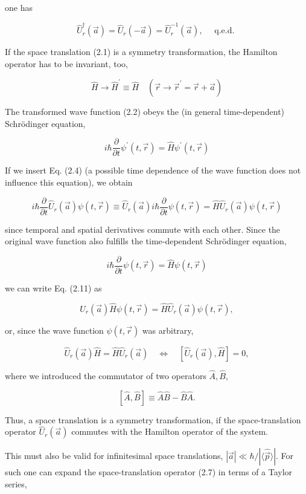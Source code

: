 \documentclass[10pt, letterpaper]{article}
\begin{document}
one has

$$
\hat{U}_{r}^{\dagger}(\vec{a})=\hat{U}_{r}(-\vec{a})=\hat{U}_{r}^{-1}(\vec{a}), \quad \text { q.e.d. }
$$

If the space translation (2.1) is a symmetry transformation, the Hamilton operator has to be invariant, too,

$$
\hat{H} \longrightarrow \hat{H}^{\prime} \equiv \hat{H} \quad\left(\vec{r} \longrightarrow \vec{r}^{\prime}=\vec{r}+\vec{a}\right)
$$

The transformed wave function (2.2) obeys the (in general time-dependent) Schrödinger equation,

$$
i \hbar \frac{\partial}{\partial t} \psi^{\prime}(t, \vec{r})=\hat{H} \psi^{\prime}(t, \vec{r})
$$

If we insert Eq. (2.4) (a possible time dependence of the wave function does not influence this equation), we obtain

$$
i \hbar \frac{\partial}{\partial t} \hat{U}_{r}(\vec{a}) \psi(t, \vec{r}) \equiv \hat{U}_{r}(\vec{a}) i \hbar \frac{\partial}{\partial t} \psi(t, \vec{r})=\hat{H} \hat{U}_{r}(\vec{a}) \psi(t, \vec{r})
$$

since temporal and spatial derivatives commute with each other. Since the original wave function also fulfills the time-dependent Schrödinger equation,

$$
i \hbar \frac{\partial}{\partial t} \psi(t, \vec{r})=\hat{H} \psi(t, \vec{r})
$$

we can write Eq. (2.11) as

$$
\hat{U}_{r}(\vec{a}) \hat{H} \psi(t, \vec{r})=\hat{H} \hat{U}_{r}(\vec{a}) \psi(t, \vec{r}),
$$

or, since the wave function $\psi(t, \vec{r})$ was arbitrary,

$$
\hat{U}_{r}(\vec{a}) \hat{H}=\hat{H} \hat{U}_{r}(\vec{a}) \quad \Longleftrightarrow \quad\left[\hat{U}_{r}(\vec{a}), \hat{H}\right]=0,
$$

where we introduced the commutator of two operators $\hat{A}, \hat{B}$,

$$
[\hat{A}, \hat{B}] \equiv \hat{A} \hat{B}-\hat{B} \hat{A} .
$$

Thus, a space translation is a symmetry transformation, if the space-translation operator $\hat{U}_{r}(\vec{a})$ commutes with the Hamilton operator of the system.

This must also be valid for infinitesimal space translations, $|\vec{a}| \ll \hbar /|\langle\hat{\vec{p}}\rangle|$. For such one can expand the space-translation operator (2.7) in terms of a Taylor series,
\end{document}
